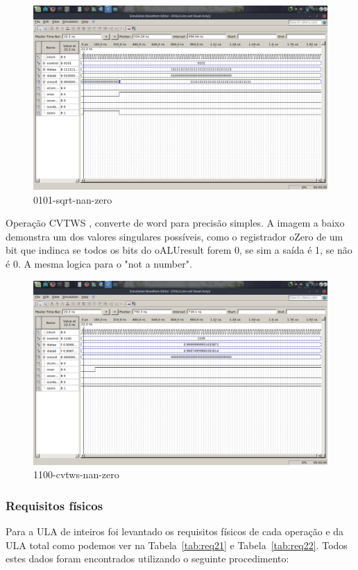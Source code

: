 \documentclass[12pt]{article}
\begin{document}
\begin{figure}[H]
	\centering
	\includegraphics[width=.8\textwidth]{imagens2/0101-sqrt-nan-zero.png}
	\caption{0101-sqrt-nan-zero}
	\label{fig:0101-sqrt-nan-zero}
\end{figure}
Operação CVTWS , converte de word para precisão simples.
A imagem a baixo demonstra um dos valores singulares possíveis, como o registrador oZero de um bit que indinca se todos os bits do oALUresult forem 0, se sim a saída é 1, se não é 0. A mesma logica para o "not a number".
\begin{figure}[H]
	\centering
	\includegraphics[width=.8\textwidth]{imagens2/1100-cvtws-nan-zero.png}
	\caption{1100-cvtws-nan-zero}
	\label{fig:1100-cvtws-nan-zero}
\end{figure}


\subsubsection{Requisitos físicos}
\label{subsubsec:ulafis}

Para a ULA de inteiros foi levantado os requisitos físicos de cada operação e da ULA total como podemos ver na Tabela~\ref{tab:req21} e Tabela~\ref{tab:req22}. Todos estes dados foram encontrados utilizando o seguinte procedimento:
\end{document}
